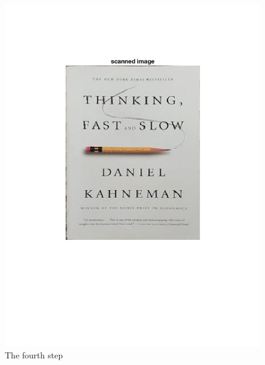 \begin{figure}[t]
\begin{center}
   \includegraphics[width=0.8\linewidth]{figures/step4.jpg}
\end{center}
\caption{The fourth step}
\label{fig:final}
\end{figure}
